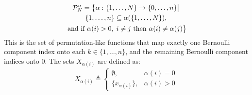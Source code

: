 \documentclass[journal,twoside]{IEEEtran}
\theoremstyle{plain}
\begin{document}
\else
\begin{multline}\label{eq:DefinitionP}
{\cal P}_N^n = \big\{\alpha : \{1,\dots,N\} \rightarrow \{0,\dots,n\} \big| \\
\{1,\dots,n\}\subseteq\alpha(\{1,\dots,N\}), \\
\mbox{ and if } \alpha(i)>0,\; i\neq j \mbox{ then } \alpha(i)\neq\alpha(j)
\big\}
\end{multline}
\fi
%
This is the set of permutation-like functions that map exactly one Bernoulli component index onto each $k\in\{1,\dots,n\}$, and the remaining Bernoulli component indices onto $0$. The sets $X_{\alpha(i)}$ are defined as:
%
\begin{equation}\label{eq:BernoulliSet}
X_{\alpha(i)} \triangleq \begin{cases}
\emptyset, & \alpha(i) = 0 \\
\{x_{\alpha(i)}\}, & \alpha(i)>0
\end{cases} 
\end{equation}
\end{document}
